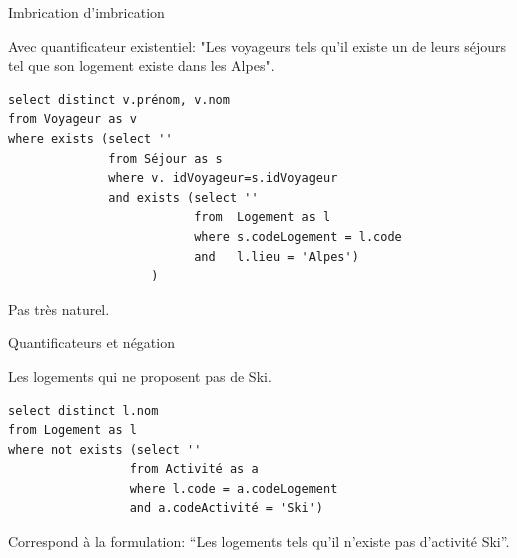 \begin{frame}[fragile]{Imbrication d'imbrication}

Avec quantificateur existentiel: "Les voyageurs tels qu'il \alert{existe} un de leurs séjours 
tel que son logement \alert{existe} dans les Alpes".

\vfill 

\begin{verbatim}
select distinct v.prénom, v.nom
from Voyageur as v
where exists (select '' 
              from Séjour as s
              where v. idVoyageur=s.idVoyageur
              and exists (select '' 
                          from  Logement as l
                          where s.codeLogement = l.code
                          and   l.lieu = 'Alpes')
                    )
\end{verbatim}

\vfill
\begin{blocgauche}
Pas très naturel.
\end{blocgauche}
\end{frame}

\begin{frame}[fragile]{Quantificateurs et négation}

Les logements qui \alert{ne proposent pas} de Ski.

\vfill 

\begin{verbatim}
select distinct l.nom
from Logement as l
where not exists (select ''
                 from Activité as a
                 where l.code = a.codeLogement
                 and a.codeActivité = 'Ski')
\end{verbatim}

\vfill
\begin{blocgauche}
Correspond à la formulation: ``Les logements tels \alert{qu'il n'existe pas} d'activité Ski''.
\end{blocgauche}
\end{frame}



